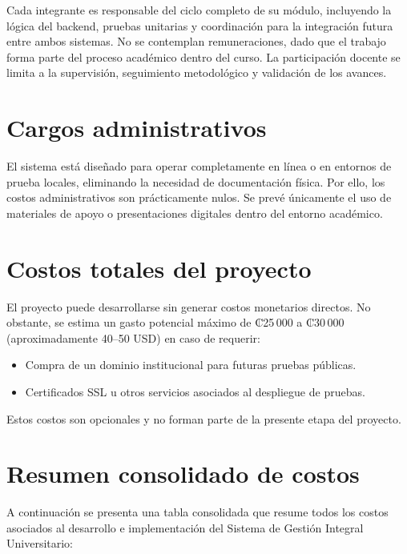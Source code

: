 Cada integrante es responsable del ciclo completo de su módulo, incluyendo la lógica del backend, pruebas unitarias y coordinación para la integración futura entre ambos sistemas. 
No se contemplan remuneraciones, dado que el trabajo forma parte del proceso académico dentro del curso. 
La participación docente se limita a la supervisión, seguimiento metodológico y validación de los avances.


\section{Cargos administrativos}
El sistema está diseñado para operar completamente en línea o en entornos de prueba locales, eliminando la necesidad de documentación física. 
Por ello, los costos administrativos son prácticamente nulos. 
Se prevé únicamente el uso de materiales de apoyo o presentaciones digitales dentro del entorno académico.

\section{Costos totales del proyecto}
El proyecto puede desarrollarse sin generar costos monetarios directos. 
No obstante, se estima un gasto potencial máximo de ₡25\,000 a ₡30\,000 (aproximadamente 40–50 USD) en caso de requerir:
\begin{itemize}
  \item Compra de un dominio institucional para futuras pruebas públicas.
  \item Certificados SSL u otros servicios asociados al despliegue de pruebas.
\end{itemize}
Estos costos son opcionales y no forman parte de la presente etapa del proyecto.

\section{Resumen consolidado de costos}

A continuación se presenta una tabla consolidada que resume todos los costos asociados al desarrollo e implementación del Sistema de Gestión Integral Universitario:

